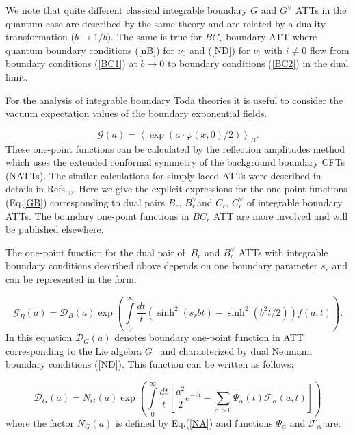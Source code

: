 \documentclass[a4paper,12pt,titlepage,final]{article}
\begin{document}
We note that quite different classical integrable
boundary $G$ and $G^{\vee}$ ATTs in the quantum case are
described by the same theory and are
related by a duality transformation ($b\rightarrow 1/b$). The same is true
for $BC_{r}$ boundary ATT where quantum boundary conditions (\ref{nB}) for
$\nu _{0}$ and (\ref{ND}) for $\nu _{i}$ with $i\neq 0$ flow from boundary
conditions (\ref{BC1}) at $b\rightarrow 0$ to boundary conditions
(\ref{BC2}) in the dual limit.

For the analysis of integrable boundary Toda theories it is useful to
consider the vacuum expectation values of the boundary exponential fields.

\begin{equation}
\mathcal{G}(a)=\left\langle \exp (a\cdot \varphi (x,0)/2)\right\rangle _{B}.
\label{GB}
\end{equation}
These one-point functions can be calculated by the reflection amplitudes
method \cite{FLZ} which uses the extended conformal symmetry of the
background boundary CFTs (NATTs). The similar calculations for simply laced
ATTs were described in details in Refs.\cite{FZZA},\cite{VAF},\cite{VFT}.
Here we give the
explicit expressions for the one-point functions (Eq.\ref{GB})
corresponding to dual pairs
$B_{r}$, $B_{r}^{\vee }$and $C_{r}$, $C_{r}^{\vee }$ of integrable boundary
ATTs. The boundary one-point functions in $BC_{r}$ ATT are more involved and
will be published elsewhere.

The one-point function for the dual pair of $\ B_{r}$ and $B_{r}^{\vee
}$ ATTs with integrable boundary conditions described above depends on
one boundary parameter $s_{r}$ and can be represented in the form:

\begin{equation}
\mathcal{G}_{B}(a)=\mathcal{D}_{B}(a)\exp \left( \int\limits_{0}^{\infty }
\frac{dt}{t}(\sinh ^{2}(s_{r}bt)-\sinh ^{2}(b^{2}t/2))f(a,t)\right) .
\label{DB}
\end{equation}
In this equation $\mathcal{D}_{G}(a)$ denotes boundary one-point function in
ATT corresponding to the Lie algebra $G$ \ and characterized by dual
Neumann boundary conditions (\ref{ND}). This function can be written as
follows:

\begin{equation}
\mathcal{D}_{G}(a)=N_{G}(a)\exp \left( \int\limits_{0}^{\infty }\frac{dt}{t}
\left[ \frac{a^{2}}{2}e^{-2t}-\sum_{\alpha >0}\Psi _{\alpha }(t)
\mathcal{F}_{\alpha }(a,t)\right] \right)  \label{DG}
\end{equation}
where the factor $N_{G}(a)$ is defined by Eq.(\ref{NA}) and functions $\Psi
_{\alpha }$ and $\mathcal{F}_{\alpha }$ are:
\end{document}
